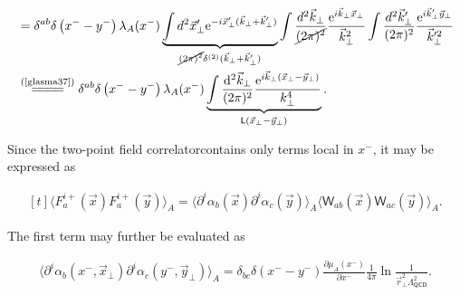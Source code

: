 \begin{note}
\begin{fullwidth}
\begin{align*}
        &=\delta^{ab}\delta\left(x^--y^-\right)\lambda_A(x^-)\underbrace{\int d^2\vec{x}^\prime_\perp \mathrm{e}^{-i\vec{x}^\prime_\perp(\vec{k}_\perp+\vec{k}^\prime_\perp)}}_{\cancel{(2\pi)^2}\delta^{(2)}(\vec{k}_\perp+\vec{k}^\prime_\perp)}\int \frac{d^2\vec{k}_\perp}{\cancel{(2\pi)^2}}\frac{\mathrm{e}^{i\vec{k}_\perp\vec{x}_\perp}}{\vec{k}_\perp^2}\int \frac{d^2\vec{k}^\prime_\perp}{(2\pi)^2}\frac{\mathrm{e}^{i\vec{k}^\prime_\perp\vec{y}_\perp}}{\vec{k}^{\prime 2}_\perp}\\
        &\stackrel{(\text{\cref{glasma37}})}{=\joinrel=\joinrel=\joinrel=}\delta^{ab}\delta\left(x^--y^-\right)\lambda_A(x^-)\underbrace{\int \frac{\mathrm{d}^{2} \vec{k}_{\perp}}{(2 \pi)^{2}} \frac{\mathrm{e}^{i \vec{k}_{\perp}(\vec{x}_\perp-\vec{y}_\perp)}}{k_{\perp}^{4}}}_{\textsf{L}(\vec{x}_\perp-\vec{y}_\perp)}.
    \end{align*}
    \end{fullwidth}
\end{note}

Since the two-point field correlatorcontains only terms local in $x^-$, it may be expressed as
\begin{fullwidth}
\begin{equation}\label{glasma40}
   \begin{aligned}[t]
    \langle F^{i+}_a(\vec{x})F^{i+}_a(\vec{y})\rangle_A=\langle\partial^{i} \alpha_{b}(\vec{x}) \partial^{i} \alpha_{c}(\vec{y})\rangle_A \langle \textsf{W}_{a b}(\vec{x}) \textsf{W}_{ac}(\vec{y})\rangle_A.
\end{aligned} 
\end{equation}
\end{fullwidth}
The first term may further be evaluated as
\begin{fullwidth}
\begin{align}\label{glasma39}
    \langle\partial^{i} \alpha_{b}(x^-,\vec{x}_\perp) \partial^{i} \alpha_{c}(y^-,\vec{y}_\perp)\rangle_A=\delta_{bc}\delta(x^--y^-)\frac{\partial\mu_A(x^-)}{\partial x^-}\frac{1}{4\pi}\ln{\frac{1}{\vec{r}_\perp^2\Lambda_{\textsf{QCD}}^2}}.
\end{align}
\end{fullwidth}


